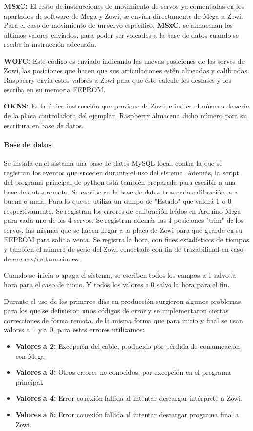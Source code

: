 \textbf{MSxC:}
El resto de instrucciones de movimiento de servos ya comentadas en los apartados de software de Mega y Zowi, se envían directamente de Mega a Zowi. Para el caso de movimiento de un servo específico, \textbf{MSxC}, se almacenan los últimos valores enviados, para poder ser volcados a la base de datos cuando se reciba la instrucción adecuada.

\textbf{WOFC:}
Este código es enviado indicando las nuevas posiciones de los servos de Zowi, las posiciones que hacen que sus articulaciones estén alineadas y calibradas. Raspberry envía estos valores a Zowi para que éste calcule los desfases y los escriba en su memoria EEPROM.

\textbf{OKNS:}
Es la única instrucción que proviene de Zowi, e indica el número de serie de la placa controladora del ejemplar, Raspberry almacena dicho número para su escritura en base de datos.

\paragraph{Base de datos}

Se instala en el sistema una base de datos MySQL local, contra la que se registran los eventos que suceden durante el uso del sistema. Además, la script del programa principal de python está también preparada para escribir a una base de datos remota.
Se escribe en la base de datos tras cada calibración, sea buena o mala. Para lo que se utiliza un campo de "Estado" que valdrá 1 o 0, respectivamente.
Se registran los errores de calibración leídos en Arduino Mega para cada uno de los 4 servos.
Se registran además las 4 posiciones "trim" de los servos, las mismas que se hacen llegar a la placa de Zowi para que guarde en su EEPROM para salir a venta.
Se registra la hora, con fines estadísticos de tiempos y tambien el número de serie del Zowi conectado con fin de trazabilidad en caso de errores/reclamaciones.

Cuando se inicia o apaga el sistema, se escriben todos los campos a 1 salvo la hora para el caso de inicio. Y todos los valores a 0 salvo la hora para el fin.

Durante el uso de los primeros días en producción surgieron algunos problemas, para los que se definieron unos códigos de error y se implementaron ciertas correcciones de forma remota, de la misma forma que para inicio y final se usan valores a 1 y a 0, para estos errores utilizamos:

\begin{itemize}
  \item \textbf{Valores a 2:} Excepción del cable, producido por pérdida de comunicación con Mega.
  \item \textbf{Valores a 3:} Otros errores no conocidos, por excepción en el programa principal.
  \item \textbf{Valores a 4:} Error conexión fallida al intentar descargar intérprete a Zowi.
  \item \textbf{Valores a 5:} Error conexión fallida al intentar descargar programa final a Zowi.
\end{itemize}

